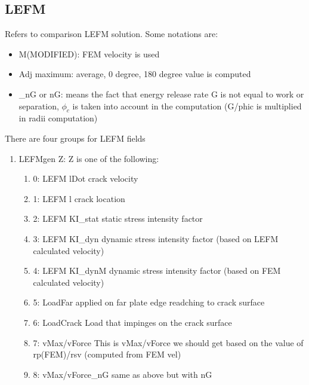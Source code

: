 \documentclass[10pt]{article}
\begin{document}
\subsection{LEFM} \label{sec:LEFM} Refers to comparison LEFM solution. 
Some notations are:
\begin{itemize}
\item	M(MODIFIED): FEM velocity is used
\item	Adj maximum:  average, 0 degree, 180 degree value is computed
\item \_nG or nG: means the fact that energy release rate G is not equal to work or separation, $\phi_c$ is taken into account in the computation (G/phic is multiplied in radii computation)
\end{itemize}

There are four groups	for LEFM fields
\begin{enumerate}
\item LEFMgen	Z: Z is one of the following:
				\begin{enumerate}
			\item 0:	LEFM lDot			crack velocity
			\item 1:	LEFM l			crack location 
			\item 2:	LEFM KI\_stat		static stress intensity factor 
			\item 3:	LEFM KI\_dyn			dynamic stress intensity factor (based on LEFM calculated velocity)
			\item 4:	LEFM KI\_dynM		dynamic stress intensity factor (based on FEM calculated velocity)
			\item 5:	LoadFar 			applied on far plate edge readching to crack surface
			\item 6:	LoadCrack 			Load that impinges on the crack surface
			\item 7:	vMax/vForce			This is vMax/vForce we should get based on the value of rp(FEM)/rsv (computed from FEM vel)
			\item 8:	vMax/vForce\_nG		same as above but with nG
		\end{enumerate}


\end{enumerate}
\end{document}
